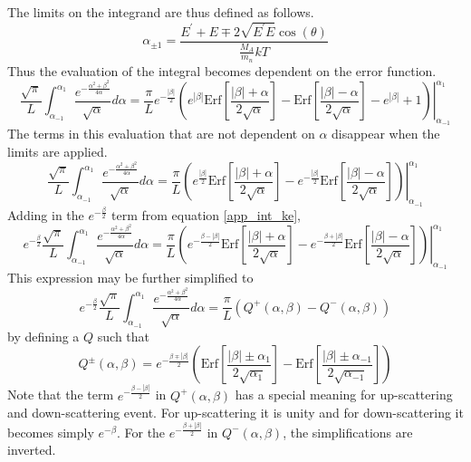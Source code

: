 The limits on the integrand are thus defined as follows.
\begin{equation}
\label{app_alpha_limits}
\alpha_{\pm 1} = \frac{E^\prime + E \mp 2\sqrt{E^\prime E}\cos(\theta)}{\frac{M_A}{m_n}kT}
\end{equation}
Thus the evaluation of the integral becomes dependent on the error function.
\begin{equation}
\label{app_int_ke_3}
\frac{\sqrt{\pi}}{L} \int_{\alpha_{-1}}^{\alpha_1} \frac{e^{-\frac{\alpha^2 + \beta^2}{4\alpha}}}{\sqrt{\alpha}} d\alpha = 
    \frac{\pi}{L} e^{-\frac{|\beta|}{2}} \left. \left(
    e^{|\beta|} \mbox{Erf}\left[\frac{|\beta| + \alpha}{2\sqrt{\alpha}}\right] - 
    \mbox{Erf}\left[\frac{|\beta| - \alpha}{2\sqrt{\alpha}}\right] - 
    e^{|\beta|} + 1
    \right) \right|_{\alpha_{-1}}^{\alpha_1}
\end{equation}
The terms in this evaluation that are not dependent on $\alpha$ disappear when the limits are applied.
\begin{equation}
\label{app_int_ke_4}
\frac{\sqrt{\pi}}{L} \int_{\alpha_{-1}}^{\alpha_1} \frac{e^{-\frac{\alpha^2 + \beta^2}{4\alpha}}}{\sqrt{\alpha}} d\alpha = 
    \frac{\pi}{L} \left. \left(
    e^{\frac{|\beta|}{2}}  \mbox{Erf}\left[\frac{|\beta| + \alpha}{2\sqrt{\alpha}}\right] - 
    e^{-\frac{|\beta|}{2}} \mbox{Erf}\left[\frac{|\beta| - \alpha}{2\sqrt{\alpha}}\right] 
    \right) \right|_{\alpha_{-1}}^{\alpha_1}
\end{equation}
Adding in the $e^{-\frac{\beta}{2}}$ term from equation \ref{app_int_ke}, 
\begin{equation}
\label{app_int_ke_5}
e^{-\frac{\beta}{2}} \frac{\sqrt{\pi}}{L} \int_{\alpha_{-1}}^{\alpha_1} \frac{e^{-\frac{\alpha^2 + \beta^2}{4\alpha}}}{\sqrt{\alpha}} d\alpha = 
    \frac{\pi}{L} \left. \left(
    e^{-\frac{\beta - |\beta|}{2}} \mbox{Erf}\left[\frac{|\beta| + \alpha}{2\sqrt{\alpha}}\right] - 
    e^{-\frac{\beta + |\beta|}{2}} \mbox{Erf}\left[\frac{|\beta| - \alpha}{2\sqrt{\alpha}}\right] 
    \right) \right|_{\alpha_{-1}}^{\alpha_1}
\end{equation}
This expression may be further simplified to 
\begin{equation}
\label{app_int_ke_6}
e^{-\frac{\beta}{2}} \frac{\sqrt{\pi}}{L} \int_{\alpha_{-1}}^{\alpha_1} \frac{e^{-\frac{\alpha^2 + \beta^2}{4\alpha}}}{\sqrt{\alpha}} d\alpha = 
    \frac{\pi}{L} \left(Q^+(\alpha, \beta) - Q^-(\alpha, \beta) \right) 
\end{equation}
by defining a $Q$ such that
\begin{equation}
\label{app_Q_pm}
Q^\pm(\alpha, \beta) = e^{-\frac{\beta \mp |\beta|}{2}} \left( 
    \mbox{Erf}\left[\frac{|\beta| \pm \alpha_1}{2\sqrt{\alpha_1}}\right] -
    \mbox{Erf}\left[\frac{|\beta| \pm \alpha_{-1}}{2\sqrt{\alpha_{-1}}}\right]  
    \right) 
\end{equation}
Note that the term $e^{-\frac{\beta - |\beta|}{2}}$ in $Q^+(\alpha, \beta)$ has a special meaning 
for up-scattering and down-scattering event.  For up-scattering it is unity and for down-scattering it 
becomes simply $e^{-\beta}$.  For the $e^{-\frac{\beta + |\beta|}{2}}$ in $Q^-(\alpha, \beta)$, 
the simplifications are inverted.


